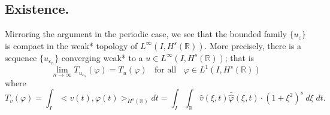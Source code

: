 \documentclass[12pt,reqno]{amsart}
\newcommand{\rr}{\mathbb{R}}
\newcommand{\ee}{\varepsilon}
\theoremstyle{plain}  %
\theoremstyle{definition}
\begin{document}
\begin{appendices}
\subsection{Existence.}
\vskip0.1in
Mirroring the argument in the periodic case, we see that the bounded
family $\{u_\ee\}$ is compact in the weak* topology of $L^\infty(I,
H^{s}(\rr))$. More precisely, there is a sequence  $\{ u_{\ee_n} \}$
converging weak* to a $ u\in L^{\infty}(I, H^s(\rr))$; that is 
		\begin{equation*}
			\label{hhweak-conv}
			\lim_{n\to \infty} T_{u_{\ee_n}}(\varphi)  =  T_u (\varphi) 
			\; \;		
			\text{ for all } \;\;  \varphi \in L^1(I, H^{s}(\rr))
		\end{equation*}
		where
		\begin{equation}
			T_v(\varphi) = \int_I <v (t), \varphi (t)>_{H^s(\rr)} dt  = \int_I
			 \int_\rr
			 \widehat{v}(\xi, t) \bar{\widehat{\varphi}} (\xi, t) \cdot (1 +
			 \xi^2)^s \ d \xi \; dt.
		\end{equation}


\end{appendices}
\end{document}
